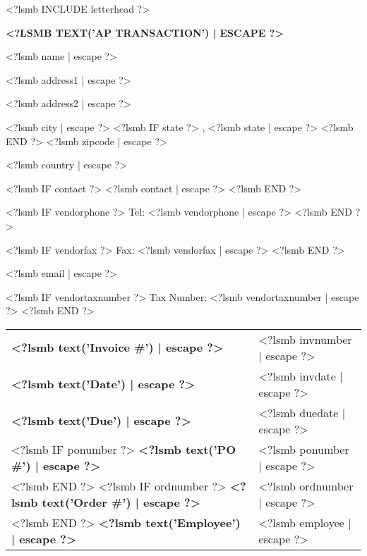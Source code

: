 \documentclass{scrartcl}
\begin{document}
\pagestyle{myheadings}
\thispagestyle{empty}

\fontsize{10pt}{12pt}\selectfont

<?lsmb INCLUDE letterhead ?>

\centerline{\MakeUppercase{\textbf{<?lsmb text('AP Transaction') | escape ?>}}}

\vspace*{0.5cm}

\parbox[t]{.5\textwidth}{
<?lsmb name | escape ?>

<?lsmb address1 | escape ?>

<?lsmb address2 | escape ?>

<?lsmb city | escape ?>
<?lsmb IF state ?>
\hspace{-0.1cm}, <?lsmb state | escape ?>
<?lsmb END ?> <?lsmb zipcode | escape ?>

<?lsmb country | escape ?>

\vspace{0.3cm}

<?lsmb IF contact ?>
<?lsmb contact | escape ?>
\vspace{0.2cm}
<?lsmb END ?>

<?lsmb IF vendorphone ?>
Tel: <?lsmb vendorphone | escape ?>
<?lsmb END ?>

<?lsmb IF vendorfax ?>
Fax: <?lsmb vendorfax | escape ?>
<?lsmb END ?>

<?lsmb email | escape ?>

<?lsmb IF vendortaxnumber ?>
Tax Number: <?lsmb vendortaxnumber | escape ?>
<?lsmb END ?>
}
\hfill
\begin{tabular}[t]{ll}
  \textbf{<?lsmb text('Invoice #') | escape ?>} & <?lsmb invnumber | escape ?> \\
  \textbf{<?lsmb text('Date') | escape ?>} & <?lsmb invdate | escape ?> \\
  \textbf{<?lsmb text('Due') | escape ?>} & <?lsmb duedate | escape ?> \\
  <?lsmb IF ponumber ?>
    \textbf{<?lsmb text('PO #') | escape ?>} & <?lsmb ponumber | escape ?> \\
  <?lsmb END ?>
  <?lsmb IF ordnumber ?>
    \textbf{<?lsmb text('Order #') | escape ?>} & <?lsmb ordnumber | escape ?> \\
  <?lsmb END ?>
  \textbf{<?lsmb text('Employee') | escape ?>} & <?lsmb employee | escape ?> \\
\end{tabular}

\vspace{1cm}
\end{document}
